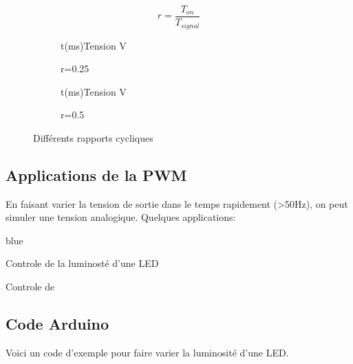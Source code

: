 $$ r = \frac{T_{on}}{T_{signal}} $$




\begin{figure}[h]  
    \centering 
      \begin{subfigure}[b]{0.4\linewidth}
        \begin{graphic}{0.8}{1}{-1}{60}{-1}{7}{t(ms)}{Tension V}{}
          \end{graphic}%
        \caption{r=0.25} 
      \end{subfigure}
    \begin{subfigure}[b]{0.4\linewidth}
        \begin{graphic}{0.8}{1}{-1}{60}{-1}{7}{t(ms)}{Tension V}{}
        \end{graphic}%
    \caption{r=0.5}
    \end{subfigure}
    \caption{Différents rapports cycliques}
\end{figure}  


\subsection{Applications de la PWM}


En faisant varier la tension de sortie dans le temps rapidement (>50Hz), on peut simuler une tension analogique.
Quelques applications: 

\begin{items}{blue}{\Bullet}
    \item Controle de la luminosté d'une LED
    \item Controle de \servo
\end{items}

\subsection{Code Arduino}

Voici un code d'exemple pour faire varier la luminosité d'une LED.

